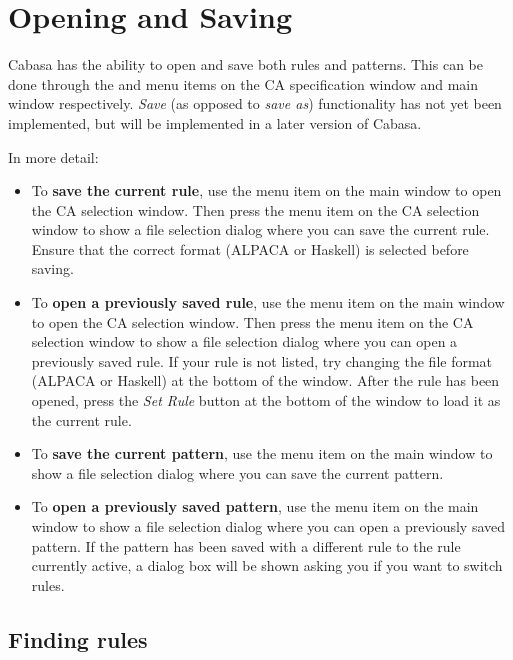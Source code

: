 \documentclass[oneside,a4paper]{memoir}
\begin{document}
\section{Opening and Saving}
\label{sec:opsav}

Cabasa has the ability to open and save both rules and patterns.
This can be done through the  and  menu items on the CA specification window and main window respectively.
\textit{Save} (as opposed to \textit{save as}) functionality has not yet been implemented, but will be implemented in a later version of Cabasa.

In more detail:

\begin{itemize}
\item To \textbf{save the current rule}, use the  menu item on the main window to open the CA selection window.
  Then press the  menu item on the CA selection window to show a file selection dialog where you can save the current rule.
  Ensure that the correct format (ALPACA or Haskell) is selected before saving.
\item To \textbf{open a previously saved rule}, use the  menu item on the main window to open the CA selection window.
  Then press the  menu item on the CA selection window to show a file selection dialog where you can open a previously saved rule.
  If your rule is not listed, try changing the file format (ALPACA or Haskell) at the bottom of the window.
  After the rule has been opened, press the \textit{Set Rule} button at the bottom of the window to load it as the current rule.
\item To \textbf{save the current pattern}, use the  menu item on the main window to show a file selection dialog where you can save the current pattern.
\item To \textbf{open a previously saved pattern}, use the  menu item on the main window to show a file selection dialog where you can open a previously saved pattern.
  If the pattern has been saved with a different rule to the rule currently active,
    a dialog box will be shown asking you if you want to switch rules.
\end{itemize}

\subsection{Finding rules}
\label{sec:findrs}
\end{document}
